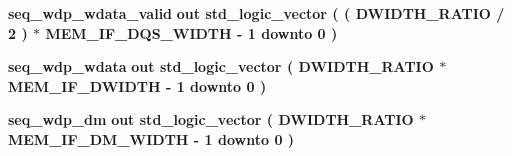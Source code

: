 \begin{DoxyCompactItemize}
\item 
{\bf seq\+\_\+wdp\+\_\+wdata\+\_\+valid}  {\bfseries {\bfseries \textcolor{keywordflow}{out}\textcolor{vhdlchar}{ }}} {\bfseries \textcolor{comment}{std\+\_\+logic\+\_\+vector}\textcolor{vhdlchar}{ }\textcolor{vhdlchar}{(}\textcolor{vhdlchar}{ }\textcolor{vhdlchar}{(}\textcolor{vhdlchar}{ }\textcolor{vhdlchar}{ }\textcolor{vhdlchar}{ }\textcolor{vhdlchar}{ }{\bfseries {\bf D\+W\+I\+D\+T\+H\+\_\+\+R\+A\+T\+IO}} \textcolor{vhdlchar}{/}\textcolor{vhdlchar}{ } \textcolor{vhdldigit}{2} \textcolor{vhdlchar}{ }\textcolor{vhdlchar}{)}\textcolor{vhdlchar}{ }\textcolor{vhdlchar}{$\ast$}\textcolor{vhdlchar}{ }\textcolor{vhdlchar}{ }\textcolor{vhdlchar}{ }{\bfseries {\bf M\+E\+M\+\_\+\+I\+F\+\_\+\+D\+Q\+S\+\_\+\+W\+I\+D\+TH}} \textcolor{vhdlchar}{-\/}\textcolor{vhdlchar}{ } \textcolor{vhdldigit}{1} \textcolor{vhdlchar}{ }\textcolor{keywordflow}{downto}\textcolor{vhdlchar}{ }\textcolor{vhdlchar}{ } \textcolor{vhdldigit}{0} \textcolor{vhdlchar}{ }\textcolor{vhdlchar}{)}\textcolor{vhdlchar}{ }} 
\item 
{\bf seq\+\_\+wdp\+\_\+wdata}  {\bfseries {\bfseries \textcolor{keywordflow}{out}\textcolor{vhdlchar}{ }}} {\bfseries \textcolor{comment}{std\+\_\+logic\+\_\+vector}\textcolor{vhdlchar}{ }\textcolor{vhdlchar}{(}\textcolor{vhdlchar}{ }\textcolor{vhdlchar}{ }\textcolor{vhdlchar}{ }\textcolor{vhdlchar}{ }{\bfseries {\bf D\+W\+I\+D\+T\+H\+\_\+\+R\+A\+T\+IO}} \textcolor{vhdlchar}{$\ast$}\textcolor{vhdlchar}{ }\textcolor{vhdlchar}{ }\textcolor{vhdlchar}{ }{\bfseries {\bf M\+E\+M\+\_\+\+I\+F\+\_\+\+D\+W\+I\+D\+TH}} \textcolor{vhdlchar}{-\/}\textcolor{vhdlchar}{ } \textcolor{vhdldigit}{1} \textcolor{vhdlchar}{ }\textcolor{keywordflow}{downto}\textcolor{vhdlchar}{ }\textcolor{vhdlchar}{ } \textcolor{vhdldigit}{0} \textcolor{vhdlchar}{ }\textcolor{vhdlchar}{)}\textcolor{vhdlchar}{ }} 
\item 
{\bf seq\+\_\+wdp\+\_\+dm}  {\bfseries {\bfseries \textcolor{keywordflow}{out}\textcolor{vhdlchar}{ }}} {\bfseries \textcolor{comment}{std\+\_\+logic\+\_\+vector}\textcolor{vhdlchar}{ }\textcolor{vhdlchar}{(}\textcolor{vhdlchar}{ }\textcolor{vhdlchar}{ }\textcolor{vhdlchar}{ }\textcolor{vhdlchar}{ }{\bfseries {\bf D\+W\+I\+D\+T\+H\+\_\+\+R\+A\+T\+IO}} \textcolor{vhdlchar}{$\ast$}\textcolor{vhdlchar}{ }\textcolor{vhdlchar}{ }\textcolor{vhdlchar}{ }{\bfseries {\bf M\+E\+M\+\_\+\+I\+F\+\_\+\+D\+M\+\_\+\+W\+I\+D\+TH}} \textcolor{vhdlchar}{-\/}\textcolor{vhdlchar}{ } \textcolor{vhdldigit}{1} \textcolor{vhdlchar}{ }\textcolor{keywordflow}{downto}\textcolor{vhdlchar}{ }\textcolor{vhdlchar}{ } \textcolor{vhdldigit}{0} \textcolor{vhdlchar}{ }\textcolor{vhdlchar}{)}\textcolor{vhdlchar}{ }} 

\end{DoxyCompactItemize}
